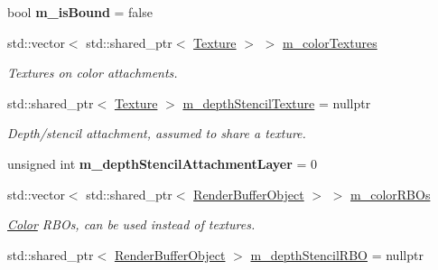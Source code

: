 \begin{Indent}
\begin{DoxyCompactItemize}
bool {\bfseries m\+\_\+is\+Bound} = false
\item 
\mbox{\label{classrev_1_1_frame_buffer_a618d76c61c059b51b6379f6dcb317e56}} 
std\+::vector$<$ std\+::shared\+\_\+ptr$<$ \mbox{\hyperlink{classrev_1_1_texture}{Texture}} $>$ $>$ \mbox{\hyperlink{classrev_1_1_frame_buffer_a618d76c61c059b51b6379f6dcb317e56}{m\+\_\+color\+Textures}}
\begin{DoxyCompactList}\small\item\em Textures on color attachments. \end{DoxyCompactList}\item 
\mbox{\label{classrev_1_1_frame_buffer_a7f2be4904c8d326debdb1d70b2092f0f}} 
std\+::shared\+\_\+ptr$<$ \mbox{\hyperlink{classrev_1_1_texture}{Texture}} $>$ \mbox{\hyperlink{classrev_1_1_frame_buffer_a7f2be4904c8d326debdb1d70b2092f0f}{m\+\_\+depth\+Stencil\+Texture}} = nullptr
\begin{DoxyCompactList}\small\item\em Depth/stencil attachment, assumed to share a texture. \end{DoxyCompactList}\item 
\mbox{\label{classrev_1_1_frame_buffer_a72410c5f71523322f8ace63ee2c12029}} 
unsigned int {\bfseries m\+\_\+depth\+Stencil\+Attachment\+Layer} = 0
\item 
\mbox{\label{classrev_1_1_frame_buffer_aac482f00c751da9b159b1f5a02f01036}} 
std\+::vector$<$ std\+::shared\+\_\+ptr$<$ \mbox{\hyperlink{classrev_1_1_render_buffer_object}{Render\+Buffer\+Object}} $>$ $>$ \mbox{\hyperlink{classrev_1_1_frame_buffer_aac482f00c751da9b159b1f5a02f01036}{m\+\_\+color\+R\+B\+Os}}
\begin{DoxyCompactList}\small\item\em \mbox{\hyperlink{classrev_1_1_color}{Color}} R\+B\+Os, can be used instead of textures. \end{DoxyCompactList}\item 
\mbox{\label{classrev_1_1_frame_buffer_a1af06563ab01f65ce72413653fb2b5a0}} 
std\+::shared\+\_\+ptr$<$ \mbox{\hyperlink{classrev_1_1_render_buffer_object}{Render\+Buffer\+Object}} $>$ \mbox{\hyperlink{classrev_1_1_frame_buffer_a1af06563ab01f65ce72413653fb2b5a0}{m\+\_\+depth\+Stencil\+R\+BO}} = nullptr

\end{DoxyCompactItemize}
\end{Indent}
